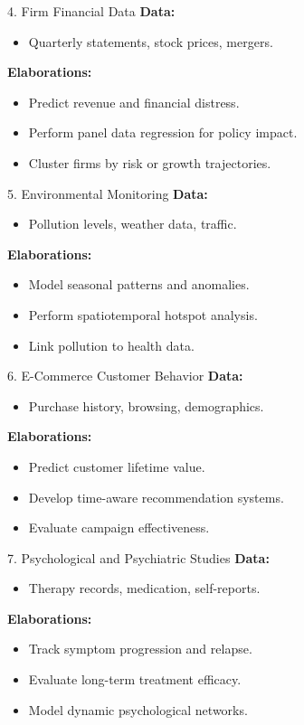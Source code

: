 \documentclass{beamer}
\begin{document}
\begin{frame}{4. Firm Financial Data}
\textbf{Data:}
\begin{itemize}
    \item Quarterly statements, stock prices, mergers.
\end{itemize}
\textbf{Elaborations:}
\begin{itemize}
    \item Predict revenue and financial distress.
    \item Perform panel data regression for policy impact.
    \item Cluster firms by risk or growth trajectories.
\end{itemize}
\end{frame}

\begin{frame}{5. Environmental Monitoring}
\textbf{Data:}
\begin{itemize}
    \item Pollution levels, weather data, traffic.
\end{itemize}
\textbf{Elaborations:}
\begin{itemize}
    \item Model seasonal patterns and anomalies.
    \item Perform spatiotemporal hotspot analysis.
    \item Link pollution to health data.
\end{itemize}
\end{frame}

\begin{frame}{6. E-Commerce Customer Behavior}
\textbf{Data:}
\begin{itemize}
    \item Purchase history, browsing, demographics.
\end{itemize}
\textbf{Elaborations:}
\begin{itemize}
    \item Predict customer lifetime value.
    \item Develop time-aware recommendation systems.
    \item Evaluate campaign effectiveness.
\end{itemize}
\end{frame}

\begin{frame}{7. Psychological and Psychiatric Studies}
\textbf{Data:}
\begin{itemize}
    \item Therapy records, medication, self-reports.
\end{itemize}
\textbf{Elaborations:}
\begin{itemize}
    \item Track symptom progression and relapse.
    \item Evaluate long-term treatment efficacy.
    \item Model dynamic psychological networks.
\end{itemize}
\end{frame}
\end{document}
